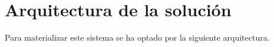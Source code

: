 \chapter{Arquitectura de la solución}
	Para materializar este sistema se ha optado por la siguiente arquitectura.

	